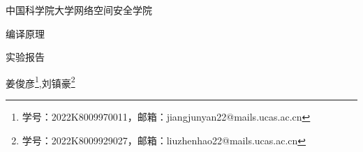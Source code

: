 \documentclass[11pt]{article}
\makeatletter
\newcommand{\Institution}{中国科学院大学网络空间安全学院}
\newcommand{\className}{编译原理}
\newcommand{\documentType}{实验报告}
\newcommand{\studentName}{姜俊彦}
\newcommand{\studentNumber}{2022K8009970011}
\newcommand{\studentEmail}{jiangjunyan22@mails.ucas.ac.cn}
\newcommand{\groupStudentName}{刘镇豪}
\newcommand{\groupStudentNumber}{2022K8009929027}
\newcommand{\groupStudentEmail}{liuzhenhao22@mails.ucas.ac.cn}
\makeatother
\begin{document}
\begin{center}
	\huge \Institution

	\className

	\LARGE \documentType

  \large \kaishu \studentName\footnote{学号：\studentNumber，邮箱：\studentEmail},\groupStudentName\footnote{学号：\groupStudentNumber，邮箱：\groupStudentEmail}
\end{center}

\tableofcontents

\newpage


\end{document}
